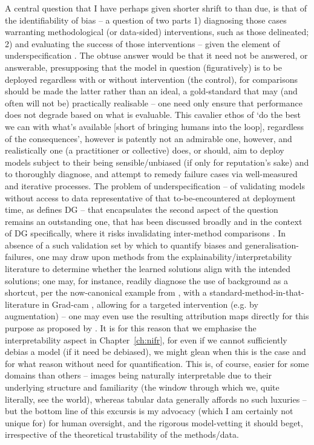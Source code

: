 %
A central question that I have perhaps given shorter shrift to than due, is that of the
identifiability of bias -- a question of two parts 1) diagnosing those cases warranting
methodological (or data-sided) interventions, such as those delineated; 2) and evaluating the
success of those interventions -- given the element of underspecification
\citep{semenova2019study}.
%
The obtuse answer would be that it need not be answered, or answerable, presupposing that the model
in question (figuratively) is to be deployed regardless with or without intervention (the control),
for comparisons should be made \wrt{} the latter rather than \wrt{} an ideal, a gold-standard that
may (and often will not be) practically realisable -- one need only ensure that performance does
not degrade based on what is evaluable.
%
%
This cavalier ethos of `do the best we can with what's available [short of bringing humans into the
loop], regardless of the consequences', however is patently not an admirable one, however, and
realistically one (a practitioner or collective) does, or should, aim to deploy models subject to
their being sensible/unbiased (if only for reputation's sake) and to thoroughly diagnose, and
attempt to remedy failure cases via well-measured and iterative processes.
%
The problem of underspecification -- of validating models without access to data representative of
that to-be-encountered at deployment time, as defines \ac{DG} -- that encapsulates the second
aspect of the question remains an outstanding one, that has been discussed broadly and in the
context of \ac{DG} specifically, where it risks invalidating inter-method comparisons
\citep{gulrajani2020search}.
%
%
In absence of a such validation set by which to quantify biases and generalisation-failures, one
may draw upon methods from the explainability/interpretability literature \citep{gunning2019xai} to
determine whether the learned solutions align with the intended solutions; one may, for instance,
readily diagnose the use of background as a shortcut, per the now-canonical example from
\cite{beery2018recognition}, with a standard-method-in-that-literature in Grad-cam
\cite{selvaraju2017grad}, allowing for a targeted intervention (e.g. by augmentation) -- one may
even use the resulting attribution maps directly for this purpose as proposed by
\cite{taghanaki2022masktune}.
%
It is for this reason that we emphasise the interpretability aspect in Chapter~\ref{ch:nifr}, for
even if we cannot sufficiently debias a model (if it need be debiased), we might glean when this is
the case and for what reason without need for quantification.
%
This is, of course, easier for some domains than others -- images being naturally interpretable due
to their underlying structure and familiarity (the window through which we, quite literally, see
the world), whereas tabular data generally affords no such luxuries -- but the bottom line of this
excursis is my advocacy (which I am certainly not unique for) for human oversight, and the rigorous
model-vetting it should beget, irrespective of the theoretical trustability of the methods/data.
 
